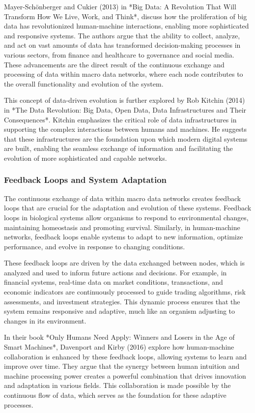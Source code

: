 \documentclass[12pt,twoside]{article}
\begin{document}
Mayer-Schönberger and Cukier (2013) in *Big Data: A Revolution That Will Transform How We Live, Work, and Think*, discuss how the proliferation of big data has revolutionized human-machine interactions, enabling more sophisticated and responsive systems. The authors argue that the ability to collect, analyze, and act on vast amounts of data has transformed decision-making processes in various sectors, from finance and healthcare to governance and social media. These advancements are the direct result of the continuous exchange and processing of data within macro data networks, where each node contributes to the overall functionality and evolution of the system.

This concept of data-driven evolution is further explored by Rob Kitchin (2014) in *The Data Revolution: Big Data, Open Data, Data Infrastructures and Their Consequences*. Kitchin emphasizes the critical role of data infrastructures in supporting the complex interactions between humans and machines. He suggests that these infrastructures are the foundation upon which modern digital systems are built, enabling the seamless exchange of information and facilitating the evolution of more sophisticated and capable networks.

\subsubsection{Feedback Loops and System Adaptation}

The continuous exchange of data within macro data networks creates feedback loops that are crucial for the adaptation and evolution of these systems. Feedback loops in biological systems allow organisms to respond to environmental changes, maintaining homeostasis and promoting survival. Similarly, in human-machine networks, feedback loops enable systems to adapt to new information, optimize performance, and evolve in response to changing conditions.

These feedback loops are driven by the data exchanged between nodes, which is analyzed and used to inform future actions and decisions. For example, in financial systems, real-time data on market conditions, transactions, and economic indicators are continuously processed to guide trading algorithms, risk assessments, and investment strategies. This dynamic process ensures that the system remains responsive and adaptive, much like an organism adjusting to changes in its environment.

In their book *Only Humans Need Apply: Winners and Losers in the Age of Smart Machines*, Davenport and Kirby (2016) explore how human-machine collaboration is enhanced by these feedback loops, allowing systems to learn and improve over time. They argue that the synergy between human intuition and machine processing power creates a powerful combination that drives innovation and adaptation in various fields. This collaboration is made possible by the continuous flow of data, which serves as the foundation for these adaptive processes.
\end{document}
